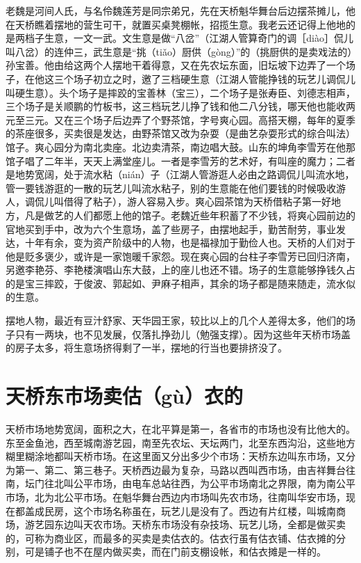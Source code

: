 \documentclass[12pt,UTF8]{ctexbook}
\begin{document}
老魏是河间人氏，与名伶魏莲芳是同宗弟兄，先在天桥魁华舞台后边摆茶摊儿，他在天桥瞧着摆地的营生可干，就置买桌凳棚帐，招揽生意。我老云还记得上他地的是两档子生意，一文一武。文生意是做“八岔”（江湖人管算奇门的调［diào］侃儿叫八岔）的连仲三，武生意是“挑（tiǎo）厨供（gòng）”的（挑厨供的是卖戏法的）孙宝善。他由给这两个人摆地干着得意，又在先农坛东面，旧坛坡下边弄了一个场子，在他这三个场子初立之时，邀了三档硬生意（江湖人管能挣钱的玩艺儿调侃儿叫硬生意）。头个场子是摔跤的宝善林（宝三），二个场子是张寿臣、刘德志相声，三个场子是关顺鹏的竹板书，这三档玩艺儿挣了钱和他二八分钱，哪天他也能收两元至三元。又在三个场子后边弄了个野茶馆，字号爽心园。高搭天棚，每年的夏季的茶座很多，买卖很是发达，由野茶馆又改为杂耍（是曲艺杂耍形式的综合叫法）馆子。爽心园分为南北卖座。北边卖清茶，南边唱大鼓。山东的坤角李雪芳在他那馆子唱了二年半，天天上满堂座儿。一者是李雪芳的艺术好，有叫座的魔力；二者是地势宽阔，处于流水粘（nián）子（江湖人管游逛人必由之路调侃儿叫流水地，管一要钱游逛的一散的玩艺儿叫流水粘子，别的生意能在他们要钱的时候吸收游人，调侃儿叫借得了粘子），游人容易入步。爽心园茶馆为天桥借粘子第一好地方，凡是做艺的人们都愿上他的馆子。老魏近些年积蓄了不少钱，将爽心园前边的官地买到手中，改为六个生意场，盖了些房子，由摆地起手，勤苦耐劳，事业发达，十年有余，变为资产阶级中的人物，也是福禄加于勤俭人也。天桥的人们对于他是贬多褒少，或许是一家饱暖千家怨。现在爽心园的台柱子李雪芳已回归济南，另邀李艳芬、李艳楼演唱山东大鼓，上的座儿也还不错。场子的生意能够挣钱久占的是宝三摔跤，于俊波、郭起如、尹麻子相声，其余的场子都是随来随走，流水似的生意。

摆地人物，最近有豆汁舒家、天华园王家，较比以上的几个人差得太多，他们的场子只有一两块，也不见发展，仅落扎挣劲儿（勉强支撑）。因为这些年天桥市场盖的房子太多，将生意场挤得剩了一半，摆地的行当也要排挤没了。





\section{天桥东市场卖估（gù）衣的}


天桥市场地势宽阔，面积之大，在北平算是第一，各省市的市场也没有比他大的。东至金鱼池，西至城南游艺园，南至先农坛、天坛两门，北至东西沟沿，这些地方糊里糊涂地都叫天桥市场。在这里面又分出多少个市场：天桥东边叫东市场，又分为第一、第二、第三巷子。天桥西边最为复杂，马路以西叫西市场，由吉祥舞台往南，坛门往北叫公平市场，由电车总站往西，为公平市场南北之界限，南为南公平市场，北为北公平市场。在魁华舞台西边内市场叫先农市场，往南叫华安市场，现在都盖成民房，这个市场名称虽在，玩艺儿是没有了。西边有片红楼，叫城南商场，游艺园东边叫天农市场。天桥东市场没有杂技场、玩艺儿场，全都是做买卖的，可称为商业区，而最多的买卖是卖估衣的。估衣行虽有估衣铺、估衣摊的分别，可是铺子也不在屋内做买卖，而在门前支棚设帐，和估衣摊是一样的。
\end{document}

